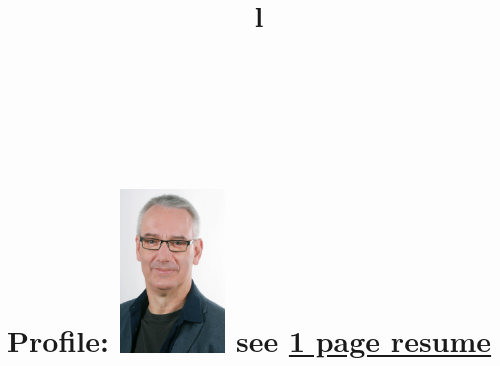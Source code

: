 \documentclass[line,margin,hidelinks]{res}
\begin{document}
\address{
  \href{https://smurp.com}{smurp.com}\\
  Berlin \& Saltspring\\
   \href{https://www.linkedin.com/in/smurp}{linkedin.com/in/smurp}\\
   \href{tel:+49.160.462.8556}{+49.160.462.8556}\\
   {\tt \href{mailto:smurp@smurp.com}{smurp@smurp.com}}}

\resumewidth=7in
\begin{resume}

\begin{format}
\title{l}\\
\\
\body\\
\end{format}

\section{Profile:
  \newline   \newline
  \includegraphics[width=1.1in]{smurp_smile_color.eps}
  \footnotesize{see \href{https://smurp.com/smurp_resume.pdf}{1 page resume}}
}



\end{resume}
\end{document}

